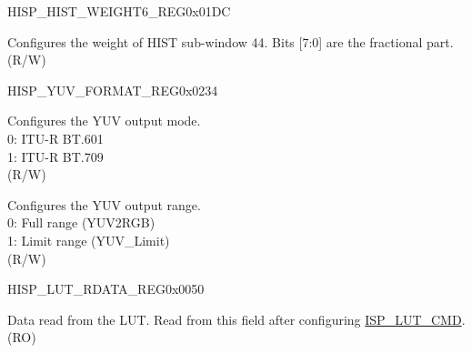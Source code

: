 \begin{register}{H}{ISP\_HIST\_WEIGHT6\_REG}{0x01DC}\label{regdesc:ISPHISTWEIGHT6REG}
%
%
\regnewline%
\begin{regdesc}\begin{reglist}
\label{fielddesc:ISPHISTWEIGHT44}\item [ISP\_HIST\_WEIGHT\_44] Configures the weight of HIST sub-window 44. Bits [7:0] are the fractional part. (R/W)
\end{reglist}\end{regdesc}
\end{register}












\begin{register}{H}{ISP\_YUV\_FORMAT\_REG}{0x0234}\label{regdesc:ISPYUVFORMATREG}
%
%
%
\regnewline%
\begin{regdesc}\begin{reglist}
\label{fielddesc:ISPYUVMODE}\item [ISP\_YUV\_MODE] Configures the YUV output mode.\\0: ITU-R BT.601\\1: ITU-R BT.709\\(R/W)
\label{fielddesc:ISPYUVRANGE}\item [ISP\_YUV\_RANGE] Configures the YUV output range.\\0: Full range (YUV2RGB)\\1: Limit range (YUV\_Limit)\\(R/W)
\end{reglist}\end{regdesc}
\end{register}


\begin{register}{H}{ISP\_LUT\_RDATA\_REG}{0x0050}\label{regdesc:ISPLUTRDATAREG}
%
\regnewline%
\begin{regdesc}\begin{reglist}
\label{fielddesc:ISPLUTRDATA}\item [ISP\_LUT\_RDATA] Data read from the LUT. Read from this field after configuring \hyperref[fielddesc:ISPLUTCMD]{ISP\_LUT\_CMD}. (RO)
\end{reglist}\end{regdesc}
\end{register}



